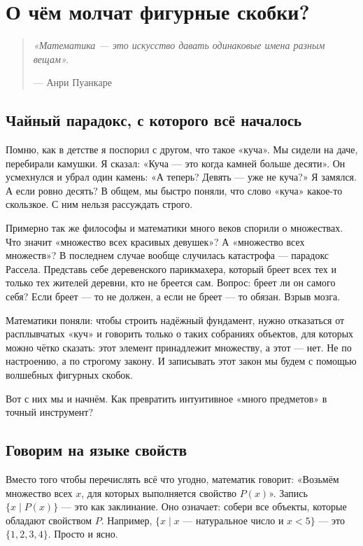 \chapter{О чём молчат фигурные скобки?}
\label{ch:first-steps}

\begin{quote}
  \textit{«Математика — это искусство давать одинаковые имена разным вещам».}
  \begin{flushright}
    --- Анри Пуанкаре
  \end{flushright}
\end{quote}

\section{Чайный парадокс, с которого всё началось}
\label{sec:tea-paradox}

Помню, как в детстве я поспорил с другом, что такое «куча». Мы сидели на даче, перебирали камушки. Я сказал: «Куча — это когда камней больше десяти». Он усмехнулся и убрал один камень: «А теперь? Девять — уже не куча?» Я замялся. А если ровно десять? В общем, мы быстро поняли, что слово «куча» какое-то скользкое. С ним нельзя рассуждать строго.

Примерно так же философы и математики много веков спорили о множествах. Что значит «множество всех красивых девушек»? А «множество всех множеств»? В последнем случае вообще случилась катастрофа — парадокс Рассела. Представь себе деревенского парикмахера, который бреет всех тех и только тех жителей деревни, кто не бреется сам. Вопрос: бреет ли он самого себя? Если бреет — то не должен, а если не бреет — то обязан. Взрыв мозга.

Математики поняли: чтобы строить надёжный фундамент, нужно отказаться от расплывчатых «куч» и говорить только о таких собраниях объектов, для которых можно чётко сказать: этот элемент принадлежит множеству, а этот — нет. Не по настроению, а по строгому закону. И записывать этот закон мы будем с помощью волшебных фигурных скобок.

Вот с них мы и начнём. Как превратить интуитивное «много предметов» в точный инструмент?

\section{Говорим на языке свойств}
\label{sec:language-properties}

Вместо того чтобы перечислять всё что угодно, математик говорит: «Возьмём множество всех $x$, для которых выполняется свойство $P(x)$». Запись $\{x \mid P(x)\}$ — это как заклинание. Оно означает: собери все объекты, которые обладают свойством $P$. Например, $\{x \mid x \text{ — натуральное число и } x < 5\}$ — это $\{1,2,3,4\}$. Просто и ясно.

